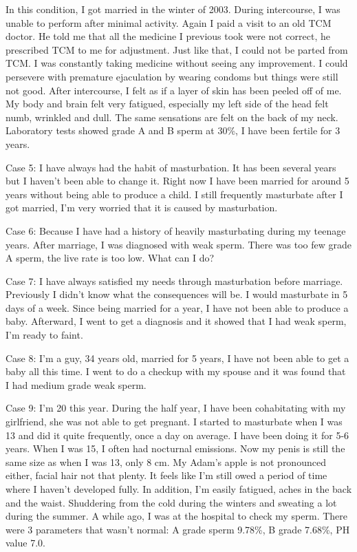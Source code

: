 \documentclass[
]{book}
\begin{document}
In this condition, I got married in the winter of 2003. During intercourse, I was unable to perform after minimal activity. Again I paid a visit to an old TCM doctor. He told me that all the medicine I previous took were not correct, he prescribed TCM to me for adjustment. Just like that, I could not be parted from TCM. I was constantly taking medicine without seeing any improvement. I could persevere with premature ejaculation by wearing condoms but things were still not good. After intercourse, I felt as if a layer of skin has been peeled off of me. My body and brain felt very fatigued, especially my left side of the head felt numb, wrinkled and dull. The same sensations are felt on the back of my neck. Laboratory tests showed grade A and B sperm at 30\%, I have been fertile for 3 years.

Case 5: I have always had the habit of masturbation. It has been several years but I haven't been able to change it. Right now I have been married for around 5 years without being able to produce a child. I still frequently masturbate after I got married, I'm very worried that it is caused by masturbation.

Case 6: Because I have had a history of heavily masturbating during my teenage years. After marriage, I was diagnosed with weak sperm. There was too few grade A sperm, the live rate is too low. What can I do?

Case 7: I have always satisfied my needs through masturbation before marriage. Previously I didn't know what the consequences will be. I would masturbate in 5 days of a week. Since being married for a year, I have not been able to produce a baby. Afterward, I went to get a diagnosis and it showed that I had weak sperm, I'm ready to faint.

Case 8: I'm a guy, 34 years old, married for 5 years, I have not been able to get a baby all this time. I went to do a checkup with my spouse and it was found that I had medium grade weak sperm.

Case 9: I'm 20 this year. During the half year, I have been cohabitating with my girlfriend, she was not able to get pregnant. I started to masturbate when I was 13 and did it quite frequently, once a day on average. I have been doing it for 5-6 years. When I was 15, I often had nocturnal emissions. Now my penis is still the same size as when I was 13, only 8 cm. My Adam's apple is not pronounced either, facial hair not that plenty. It feels like I'm still owed a period of time where I haven't developed fully. In addition, I'm easily fatigued, aches in the back and the waist. Shuddering from the cold during the winters and sweating a lot during the summer. A while ago, I was at the hospital to check my sperm. There were 3 parameters that wasn't normal: A grade sperm 9.78\%, B grade 7.68\%, PH value 7.0.
\end{document}
